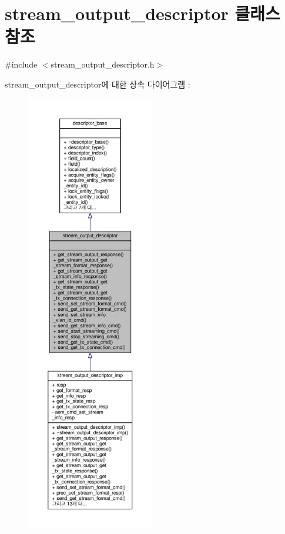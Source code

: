 \hypertarget{classavdecc__lib_1_1stream__output__descriptor}{}\section{stream\+\_\+output\+\_\+descriptor 클래스 참조}
\label{classavdecc__lib_1_1stream__output__descriptor}


{\ttfamily \#include $<$stream\+\_\+output\+\_\+descriptor.\+h$>$}



stream\+\_\+output\+\_\+descriptor에 대한 상속 다이어그램 \+: 
\nopagebreak
\begin{figure}[H]
\begin{center}
\leavevmode
\includegraphics[height=550pt]{classavdecc__lib_1_1stream__output__descriptor__inherit__graph}
\end{center}
\end{figure}


